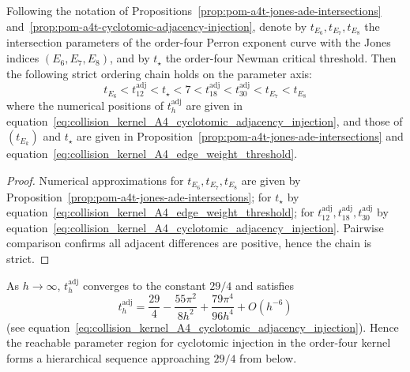 \begin{corollary}\label{cor:pom-a4t-cyclotomic-adj-ordering-chain}
Following the notation of Propositions~\ref{prop:pom-a4t-jones-ade-intersections} and~\ref{prop:pom-a4t-cyclotomic-adjacency-injection}, denote by \(t_{E_6},t_{E_7},t_{E_8}\) the intersection parameters of the order-four Perron exponent curve with the Jones indices \((E_6,E_7,E_8)\), and by \(t_\star\) the order-four Newman critical threshold.
Then the following strict ordering chain holds on the parameter axis:
\[
\boxed{\;
t_{E_6}
<
t_{12}^{\mathrm{adj}}
<
t_\star
<
7
<
t_{18}^{\mathrm{adj}}
<
t_{30}^{\mathrm{adj}}
<
t_{E_7}
<
t_{E_8}\;}
\]
where the numerical positions of \(t_h^{\mathrm{adj}}\) are given in equation~\eqref{eq:collision_kernel_A4_cyclotomic_adjacency_injection}, and those of \((t_{E_k})\) and \(t_\star\) are given in Proposition~\ref{prop:pom-a4t-jones-ade-intersections} and equation~\eqref{eq:collision_kernel_A4_edge_weight_threshold}.
\end{corollary}
\begin{proof}
Numerical approximations for \(t_{E_6},t_{E_7},t_{E_8}\) are given by Proposition~\ref{prop:pom-a4t-jones-ade-intersections}; for \(t_\star\) by equation~\eqref{eq:collision_kernel_A4_edge_weight_threshold}; for \(t_{12}^{\mathrm{adj}},t_{18}^{\mathrm{adj}},t_{30}^{\mathrm{adj}}\) by equation~\eqref{eq:collision_kernel_A4_cyclotomic_adjacency_injection}.
Pairwise comparison confirms all adjacent differences are positive, hence the chain is strict.
\end{proof}

\begin{remark}\label{rem:pom-a4t-cyclotomic-adj-asymptotic}
As \(h\to\infty\), \(t_h^{\mathrm{adj}}\) converges to the constant \(29/4\) and satisfies
\[
t_h^{\mathrm{adj}}
=\frac{29}{4}
-\frac{55\pi^2}{8h^2}
+\frac{79\pi^4}{96h^4}
+O(h^{-6})
\]
(see equation~\eqref{eq:collision_kernel_A4_cyclotomic_adjacency_injection}).
Hence the reachable parameter region for cyclotomic injection in the order-four kernel forms a hierarchical sequence approaching \(29/4\) from below.
\end{remark}

